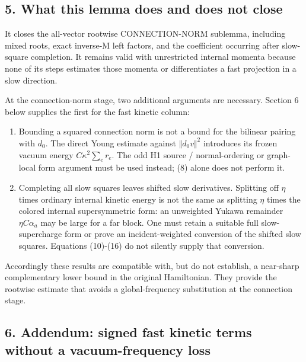 \subsection{5. What this lemma does and does not
close}\label{e-what-this-lemma-does-and-does-not-close}

It closes the all-vector rootwise CONNECTION-NORM sublemma, including
mixed roots, exact inverse-M left factors, and the coefficient occurring
after slow-square completion. It remains valid with unrestricted
internal momenta because none of its steps estimates those momenta or
differentiates a fast projection in a slow direction.

At the connection-norm stage, two additional arguments are necessary.
Section \(6\) below supplies the first for the fast kinetic column:

\begin{enumerate}
\def\labelenumi{\arabic{enumi}.}
\tightlist
\item
  Bounding a squared connection norm is not a bound for the bilinear
  pairing with \(d_{0}\). The direct Young estimate against
  \(\Vert d_{0} v\Vert ^{2}\) introduces its frozen vacuum energy
  \(C \kappa ^{2} \sum _{e} r_{e}\). The odd H1 source / normal-ordering
  or graph-local form argument must be used instead; (8) alone does not
  perform it.
\item
  Completing all slow squares leaves shifted slow derivatives. Splitting
  off \(\eta\) times ordinary internal kinetic energy is not the same as
  splitting \(\eta\) times the colored internal supersymmetric form: an
  unweighted Yukawa remainder \(\eta  C \alpha _{a}\) may be large for a
  far block. One must retain a suitable full slow-supercharge form or
  prove an incident-weighted conversion of the shifted slow squares.
  Equations (10)-(16) do not silently supply that conversion.
\end{enumerate}

Accordingly these results are compatible with, but do not establish, a
near-sharp complementary lower bound in the original Hamiltonian. They
provide the rootwise estimate that avoids a global-frequency
substitution at the connection stage.

\subsection{6. Addendum: signed fast kinetic terms without a
vacuum-frequency
loss}\label{e-addendum-signed-fast-kinetic-terms-without-a-vacuum-frequency-loss}

